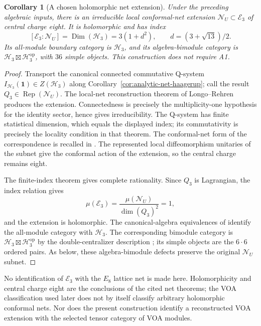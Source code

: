 \documentclass[11pt,a4paper]{article}
\newtheorem{corollary}[theorem]{Corollary}
\theoremstyle{definition}
\DeclareMathOperator{\Rep}{Rep}
\newcommand{\HH}{\mathcal H}
\begin{document}
\begin{corollary}[A chosen holomorphic net extension]
\label{cor:analytic-net-extension}
Under the preceding algebraic inputs, there is an irreducible local
conformal-net extension $\mathcal N_U\subset\mathcal E_3$ of central
charge eight.  It is holomorphic and has index
\[
 [\mathcal E_3:\mathcal N_U]
 =\operatorname{Dim}(\HH_3)=3(1+d^2),
 \qquad d=(3+\sqrt{13})/2.
\]
Its all-module boundary category is $\HH_3$, and its algebra-bimodule
category is $\HH_3\boxtimes\HH_3^{\mathrm{op}}$, with $36$ simple
objects.  This construction does not require A1.
\end{corollary}
\begin{proof}
Transport the canonical connected commutative Q-system
$I_{\HH_3}(\mathbf1)\in Z(\HH_3)$ along
Corollary~\ref{cor:analytic-net-haagerup}; call the result
$Q_3\in\Rep(\mathcal N_U)$.  The local-net reconstruction theorem
of Longo--Rehren~\cite[Theorem~4.9]{LRNets} produces the extension.
Connectedness is precisely the multiplicity-one hypothesis for the
identity sector, hence gives irreducibility.  The Q-system has finite
statistical dimension, which equals the displayed index; its
commutativity is precisely the locality condition in that theorem.
The conformal-net form of the correspondence is recalled in
\cite[Section~2.6]{BisTY}.  The represented local diffeomorphism
unitaries of the subnet give the conformal action of the extension,
so the central charge remains eight.

The finite-index theorem \cite[Theorem~24]{Longo} gives complete
rationality.  Since $Q_3$ is Lagrangian, the index relation gives
\[
 \mu(\mathcal E_3)
 =\frac{\mu(\mathcal N_U)}{\dim(Q_3)^2}=1,
\]
and the extension is holomorphic.  The canonical-algebra equivalences
of \cite[Corollary~4.1 and Proposition~4.4]{DMNO} identify the
all-module category with $\HH_3$.  The corresponding bimodule
category is $\HH_3\boxtimes\HH_3^{\mathrm{op}}$ by the
double-centralizer description \cite[Sections~4 and~8]{Mueger}; its
simple objects are the $6\cdot6$ ordered pairs.  As below, these
algebra-bimodule defects preserve the original $\mathcal N_U$ subnet.
\end{proof}

No identification of $\mathcal E_3$ with the $E_8$ lattice net is made
here.  Holomorphicity and central charge eight are the conclusions
of the cited net theorems; the VOA classification used later does not
by itself classify arbitrary holomorphic conformal nets.  Nor does
the present construction identify a reconstructed VOA extension with
the selected tensor category of VOA modules.
\end{document}
